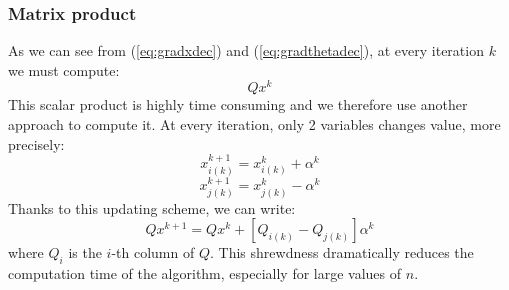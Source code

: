 \subsubsection{Matrix product}
As we can see from (\ref{eq:gradxdec}) and (\ref{eq:gradthetadec}), at every iteration $k$ we must compute:
\begin{equation}
Q  x^{k}
\end{equation}
This scalar product is highly time consuming and we therefore use another approach to compute it. At every iteration, only 2 variables changes value, more precisely:
\begin{equation}
x_{i(k)}^{k+1} = x_{i(k)}^{k} + \alpha^{k}
\end{equation}
\begin{equation}
x_{j(k)}^{k+1} = x_{j(k)}^{k} - \alpha^{k}
\end{equation}
Thanks to this updating scheme, we can write:
\begin{equation}
Q x^{k+1} = Q  x^{k} + \left[Q_{i(k)} - Q_{j(k)}\right]\alpha^{k} 
\end{equation}
where $Q_{i}$ is the $i$-th column of $Q$. This shrewdness dramatically reduces the computation time of the algorithm, especially for large values of $n$.

